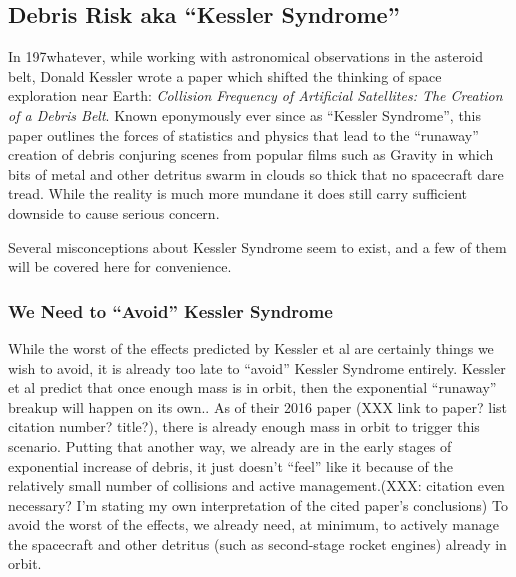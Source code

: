 \subsection{Debris Risk aka ``Kessler Syndrome''}

In 197whatever, while working with astronomical observations in the
asteroid belt, Donald Kessler wrote a paper which shifted the thinking
of space exploration near Earth: {\it Collision Frequency of
  Artificial Satellites: The Creation of a Debris
  Belt}.\cite{kessler-og} Known eponymously ever since as ``Kessler
Syndrome'', this paper outlines the forces of statistics and physics
that lead to the ``runaway'' creation of debris conjuring scenes from
popular films such as Gravity in which bits of metal and other
detritus swarm in clouds so thick that no spacecraft dare tread.
While the reality is much more mundane it does still carry sufficient
downside to cause serious concern.

Several misconceptions about Kessler Syndrome seem to exist, and a few
of them will be covered here for convenience.

\subsubsection{We Need to ``Avoid'' Kessler Syndrome}
While the worst of the effects predicted by Kessler et al are
certainly things we wish to avoid, it is already too late to ``avoid''
Kessler Syndrome entirely.  Kessler et al predict that once enough
mass is in orbit, then the exponential ``runaway'' breakup will happen
on its own.\cite[xxx]{kessler-reunion}.  As of their 2016 paper (XXX
link to paper?  list citation number?  title?), there is already
enough mass in orbit to trigger this
scenario.\cite[xxx]{kessler-reunion} Putting that another way, we
already are in the early stages of exponential increase of debris, it
just doesn't ``feel'' like it because of the relatively small number
of collisions and active management.(XXX: citation even necessary?
I'm stating my own interpretation of the cited paper's conclusions) To
avoid the worst of the effects, we already need, at minimum, to
actively manage the spacecraft and other detritus (such as
second-stage rocket engines) already in orbit.\cite[xxx]{kessler
  reunion}

